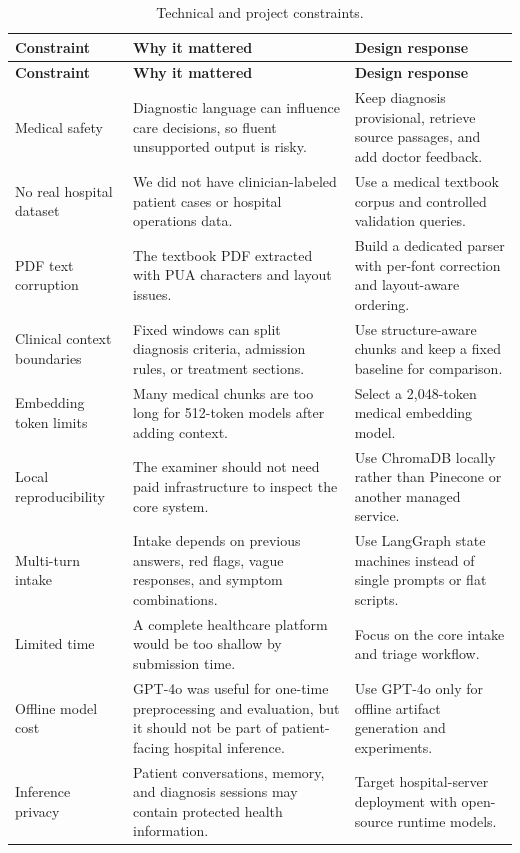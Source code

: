 \begin{longtable}{p{} p{} p{}}
\caption{Technical and project constraints.}
\label{tab:technical_constraints}\\
\toprule
\textbf{Constraint} & \textbf{Why it mattered} & \textbf{Design response}\\
\midrule
\endfirsthead
\toprule
\textbf{Constraint} & \textbf{Why it mattered} & \textbf{Design response}\\
\midrule
\endhead
Medical safety & Diagnostic language can influence care decisions, so fluent unsupported output is risky. & Keep diagnosis provisional, retrieve source passages, and add doctor feedback.\\
No real hospital dataset & We did not have clinician-labeled patient cases or hospital operations data. & Use a medical textbook corpus and controlled validation queries.\\
PDF text corruption & The textbook PDF extracted with PUA characters and layout issues. & Build a dedicated parser with per-font correction and layout-aware ordering.\\
Clinical context boundaries & Fixed windows can split diagnosis criteria, admission rules, or treatment sections. & Use structure-aware chunks and keep a fixed baseline for comparison.\\
Embedding token limits & Many medical chunks are too long for 512-token models after adding context. & Select a 2,048-token medical embedding model.\\
Local reproducibility & The examiner should not need paid infrastructure to inspect the core system. & Use ChromaDB locally rather than Pinecone or another managed service.\\
Multi-turn intake & Intake depends on previous answers, red flags, vague responses, and symptom combinations. & Use LangGraph state machines instead of single prompts or flat scripts.\\
Limited time & A complete healthcare platform would be too shallow by submission time. & Focus on the core intake and triage workflow.\\
Offline model cost & GPT-4o was useful for one-time preprocessing and evaluation, but it should not be part of patient-facing hospital inference. & Use GPT-4o only for offline artifact generation and experiments.\\
Inference privacy & Patient conversations, memory, and diagnosis sessions may contain protected health information. & Target hospital-server deployment with open-source runtime models.\\

\end{longtable}
